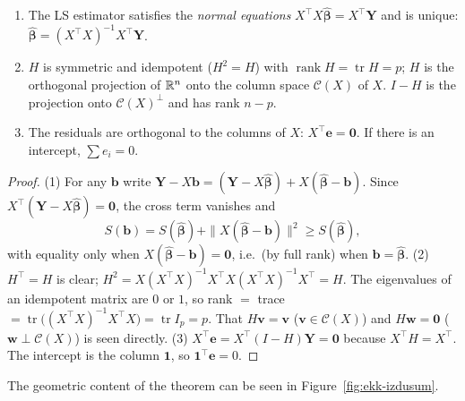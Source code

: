 \documentclass[main.tex]{subfiles}
\begin{document}
\begin{theorem}\label{thm:ekk}
\begin{enumerate}
  \item The LS estimator satisfies the \emph{normal equations} $X^\top X\hat{\bm\beta}=X^\top\mathbf Y$ and is unique: $\hat{\bm\beta}=(X^\top X)^{-1}X^\top\mathbf Y$.
  \item $H$ is symmetric and idempotent ($H^2=H$) with $\operatorname{rank}H=\operatorname{tr}H=p$; $H$ is the orthogonal projection of $\mathbb{R}^n$ onto the column space $\mathcal C(X)$ of $X$. $I-H$ is the projection onto $\mathcal C(X)^\perp$ and has rank $n-p$.
  \item The residuals are orthogonal to the columns of $X$: $X^\top\mathbf e=\mathbf 0$. If there is an intercept, $\sum e_i=0$.
\end{enumerate}
\end{theorem}
\begin{proof}
(1) For any $\mathbf b$ write $\mathbf Y-X\mathbf b=(\mathbf Y-X\hat{\bm\beta})+X(\hat{\bm\beta}-\mathbf b)$. Since $X^\top(\mathbf Y-X\hat{\bm\beta})=\mathbf 0$, the cross term vanishes and
\[
S(\mathbf b)=S(\hat{\bm\beta})+\|X(\hat{\bm\beta}-\mathbf b)\|^2\ge S(\hat{\bm\beta}),
\]
with equality only when $X(\hat{\bm\beta}-\mathbf b)=\mathbf 0$, i.e.\ (by full rank) when $\mathbf b=\hat{\bm\beta}$.
(2) $H^\top=H$ is clear; $H^2=X(X^\top X)^{-1}X^\top X(X^\top X)^{-1}X^\top=H$. The eigenvalues of an idempotent matrix are $0$ or $1$, so rank $=$ trace $=\operatorname{tr}\big((X^\top X)^{-1}X^\top X\big)=\operatorname{tr}I_p=p$. That $H\mathbf v=\mathbf v$ ($\mathbf v\in\mathcal C(X)$) and $H\mathbf w=\mathbf 0$ ($\mathbf w\perp\mathcal C(X)$) is seen directly.
(3) $X^\top\mathbf e=X^\top(I-H)\mathbf Y=\mathbf 0$ because $X^\top H=X^\top$. The intercept is the column $\mathbf 1$, so $\mathbf 1^\top\mathbf e=0$.
\end{proof}

The geometric content of the theorem can be seen in Figure~\ref{fig:ekk-izdusum}.
\end{document}
